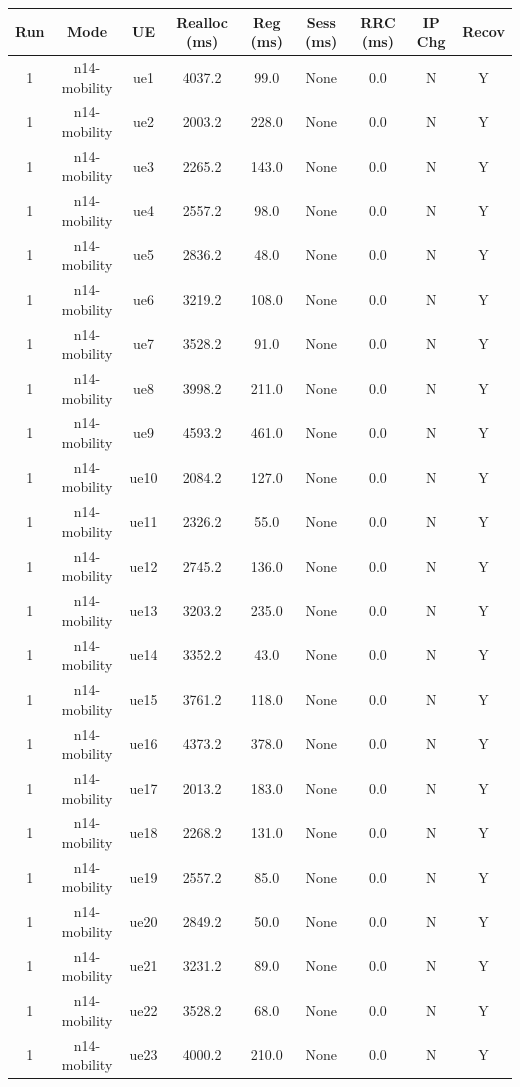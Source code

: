 \begin{table}[ht]
\centering
\begin{tabular}{|c|c|c|c|c|c|c|c|c|}
\hline
Run & Mode & UE & Realloc (ms) & Reg (ms) & Sess (ms) & RRC (ms) & IP Chg & Recov \\
\hline
1 & n14-mobility & ue1 & 4037.2 & 99.0 & None & 0.0 & N & Y \\
1 & n14-mobility & ue2 & 2003.2 & 228.0 & None & 0.0 & N & Y \\
1 & n14-mobility & ue3 & 2265.2 & 143.0 & None & 0.0 & N & Y \\
1 & n14-mobility & ue4 & 2557.2 & 98.0 & None & 0.0 & N & Y \\
1 & n14-mobility & ue5 & 2836.2 & 48.0 & None & 0.0 & N & Y \\
1 & n14-mobility & ue6 & 3219.2 & 108.0 & None & 0.0 & N & Y \\
1 & n14-mobility & ue7 & 3528.2 & 91.0 & None & 0.0 & N & Y \\
1 & n14-mobility & ue8 & 3998.2 & 211.0 & None & 0.0 & N & Y \\
1 & n14-mobility & ue9 & 4593.2 & 461.0 & None & 0.0 & N & Y \\
1 & n14-mobility & ue10 & 2084.2 & 127.0 & None & 0.0 & N & Y \\
1 & n14-mobility & ue11 & 2326.2 & 55.0 & None & 0.0 & N & Y \\
1 & n14-mobility & ue12 & 2745.2 & 136.0 & None & 0.0 & N & Y \\
1 & n14-mobility & ue13 & 3203.2 & 235.0 & None & 0.0 & N & Y \\
1 & n14-mobility & ue14 & 3352.2 & 43.0 & None & 0.0 & N & Y \\
1 & n14-mobility & ue15 & 3761.2 & 118.0 & None & 0.0 & N & Y \\
1 & n14-mobility & ue16 & 4373.2 & 378.0 & None & 0.0 & N & Y \\
1 & n14-mobility & ue17 & 2013.2 & 183.0 & None & 0.0 & N & Y \\
1 & n14-mobility & ue18 & 2268.2 & 131.0 & None & 0.0 & N & Y \\
1 & n14-mobility & ue19 & 2557.2 & 85.0 & None & 0.0 & N & Y \\
1 & n14-mobility & ue20 & 2849.2 & 50.0 & None & 0.0 & N & Y \\
1 & n14-mobility & ue21 & 3231.2 & 89.0 & None & 0.0 & N & Y \\
1 & n14-mobility & ue22 & 3528.2 & 68.0 & None & 0.0 & N & Y \\
1 & n14-mobility & ue23 & 4000.2 & 210.0 & None & 0.0 & N & Y \\

\end{tabular}
\end{table}
